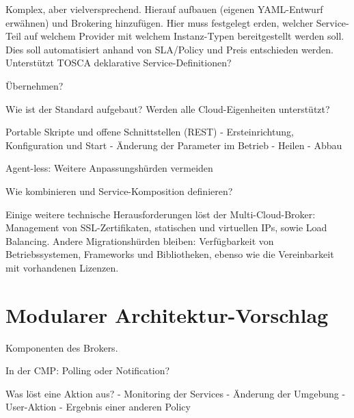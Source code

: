 Komplex, aber vielversprechend. Hierauf aufbauen (eigenen YAML-Entwurf erwähnen) und Brokering hinzufügen. Hier muss festgelegt erden, welcher Service-Teil auf welchem Provider mit welchem Instanz-Typen bereitgestellt werden soll. Dies soll automatisiert anhand von SLA/Policy und Preis entschieden werden. Unterstützt TOSCA deklarative Service-Definitionen?

Übernehmen?

Wie ist der Standard aufgebaut? Werden alle Cloud-Eigenheiten unterstützt?


Portable Skripte und offene Schnittstellen (REST)
- Ersteinrichtung, Konfiguration und Start
- Änderung der Parameter im Betrieb
- Heilen
- Abbau

Agent-less: Weitere Anpassungshürden vermeiden

Wie kombinieren und Service-Komposition definieren?

Einige weitere technische Herausforderungen löst der Multi-Cloud-Broker: Management von SSL-Zertifikaten, statischen und virtuellen IPs, sowie Load Balancing. Andere Migrationshürden bleiben: Verfügbarkeit von Betriebssystemen, Frameworks und Bibliotheken, ebenso wie die Vereinbarkeit mit vorhandenen Lizenzen.



\section{Modularer Architektur-Vorschlag}

Komponenten des Brokers.


In der CMP: Polling oder Notification?

Was löst eine Aktion aus?
- Monitoring der Services
- Änderung der Umgebung
- User-Aktion
- Ergebnis einer anderen Policy

